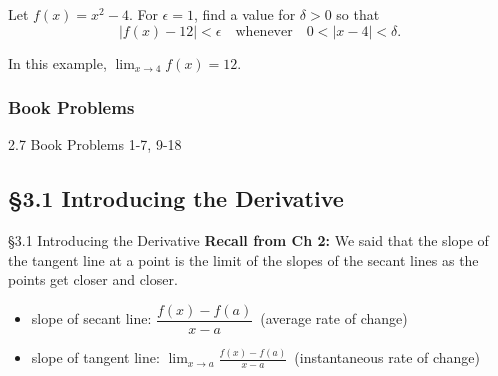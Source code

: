 \documentclass[cal1spr16Lectures.tex]{subfiles}
\begin{document}
\begin{frame}{}
\begin{exe} Let $f(x)=x^2-4$.  For $\epsilon=1$, find a value for $\delta>0$ so that 
\[|f(x)-12|<\epsilon \quad \text{whenever}\quad 0<|x-4|<\delta.\]
\end{exe}
In this example,  $\lim_{x \to 4}f(x)=12.$  
\end{frame}

\subsubsection{Book Problems}

\begin{frame}
\begin{block}{2.7 Book Problems} 1-7, 9-18 \end{block}
\end{frame}

\subsection[3.1 Introducing the Derivative]{\S 3.1 Introducing the Derivative}

\begin{frame}{\S 3.1 Introducing the Derivative}{}
{\bf Recall from Ch 2:}  We said that the slope of the tangent line at a point is the limit of the slopes of the secant lines as the points get closer and closer.
\begin{itemize}
\item slope of secant line:  $\dfrac{f(x)-f(a)}{x-a}$\ (average rate of change) 
\item slope of tangent line:  $\lim_{x \to a} \frac{f(x)-f(a)}{x-a}$\ (instantaneous rate of change)
\end{itemize}
\end{frame}

\begin{frame}
\end{frame}
\end{document}
